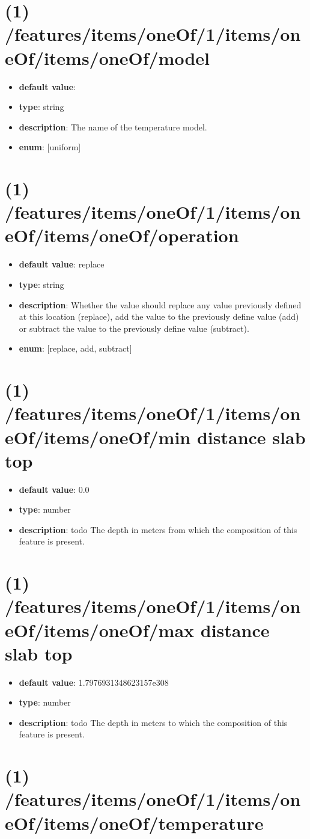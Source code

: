 \section{(1) /features/items/oneOf/1/items/oneOf/items/oneOf/model}
\begin{itemize}[leftmargin=1em]\item {\bf default value}: 
\item {\bf type}: string
\item {\bf description}: The name of the temperature model.
\item {\bf enum}: [uniform]\end{itemize}\section{(1) /features/items/oneOf/1/items/oneOf/items/oneOf/operation}
\begin{itemize}[leftmargin=1em]\item {\bf default value}: replace
\item {\bf type}: string
\item {\bf description}: Whether the value should replace any value previously defined at this location (replace), add the value to the previously define value (add) or subtract the value to the previously define value (subtract).
\item {\bf enum}: [replace, add, subtract]\end{itemize}\section{(1) /features/items/oneOf/1/items/oneOf/items/oneOf/min distance slab top}
\begin{itemize}[leftmargin=1em]\item {\bf default value}: 0.0
\item {\bf type}: number
\item {\bf description}: todo The depth in meters from which the composition of this feature is present.
\end{itemize}\section{(1) /features/items/oneOf/1/items/oneOf/items/oneOf/max distance slab top}
\begin{itemize}[leftmargin=1em]\item {\bf default value}: 1.7976931348623157e308
\item {\bf type}: number
\item {\bf description}: todo The depth in meters to which the composition of this feature is present.
\end{itemize}\section{(1) /features/items/oneOf/1/items/oneOf/items/oneOf/temperature}
